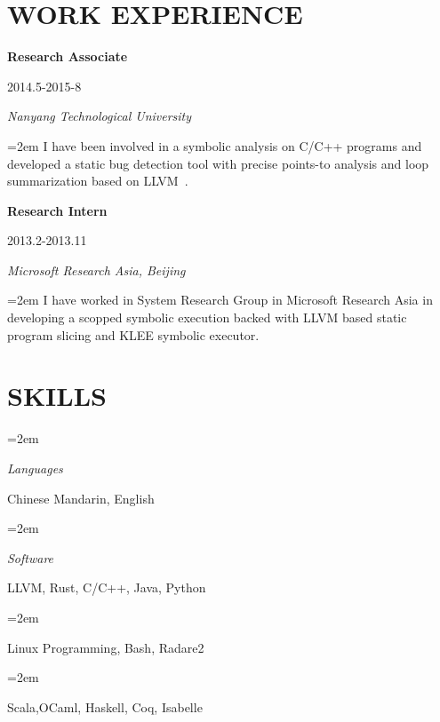 \documentclass[paper=a4,fontsize=11pt]{article} %
\newlength{\spacebox}
\newcommand{\sepspace}{\vspace*{9pt}}		%
\newcommand{\NewPart}[1]{\section*{\uppercase{#1}}}
\newcommand{\PersonalEntry}[2]{
		\noindent\hangindent=2em\hangafter=0 %
		\parbox{\spacebox}{        %
		\textit{#1}}		       %
		\hspace{1.5em} #2 \par}    %
\newcommand{\SkillsEntry}[2]{      %
		\noindent\hangindent=2em\hangafter=0 %
		\parbox{\spacebox}{        %
		\textit{#1}}			   %
		\hspace{1.5em} #2 \par}    %
\newcommand{\EducationEntry}[4]{
		\noindent \textbf{#1} \hfill      %
			\parbox{12em}{%
			\hfill\color{Black}#2} \par  %
		\noindent \textit{#3} \par        %
		\noindent\hangindent=2em\hangafter=0 \small #4 %
		\normalsize \par}
\begin{document}
\NewPart{Work experience}{}

\EducationEntry{Research Associate}{2014.5-2015-8}{Nanyang Technological University}{
I have been involved in a symbolic analysis on C/C++ programs and developed a static bug detection tool with precise points-to analysis and loop summarization based on LLVM~\cite{XieLLLC15}.}
\sepspace

\EducationEntry{Research Intern}{2013.2-2013.11}{Microsoft Research Asia, Beijing}{
I have worked in System Research Group in Microsoft Research Asia in developing a scopped symbolic execution backed with LLVM based static program slicing and KLEE symbolic executor.}
\sepspace

\NewPart{Skills}{}

\SkillsEntry{Languages}{Chinese Mandarin, English}
\SkillsEntry{Software}{{LLVM, Rust, C/C++, Java, Python}}
\SkillsEntry{}{Linux Programming, Bash, Radare2}
\SkillsEntry{}{Scala,OCaml, Haskell, Coq, Isabelle}

\pagebreak
\end{document}
